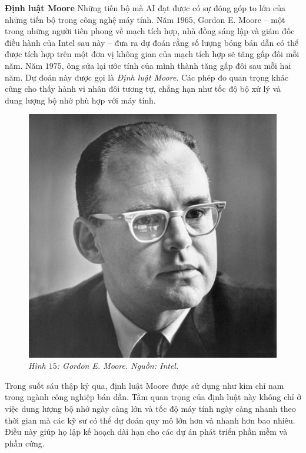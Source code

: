 \begin{multicols}{2}
	\vskip 0.1cm
	\textbf{\color{timhieukhoahoc}Định luật Moore}
	\vskip 0.1cm
	Những tiến bộ mà AI đạt được có sự đóng góp to lớn của những tiến bộ trong công nghệ máy tính. 
	\vskip 0.1cm
	Năm $1965$, Gordon E. Moore -- một trong những người tiên phong về mạch tích hợp, nhà đồng sáng lập và giám đốc điều hành của Intel sau này -- đưa ra dự đoán rằng số lượng bóng bán dẫn có thể được tích hợp trên một đơn vị không gian của mạch tích hợp sẽ tăng gấp đôi mỗi năm. Năm $1975$, ông sửa lại ước tính của mình thành tăng gấp đôi sau mỗi hai năm. Dự đoán này được gọi là \textit{Định luật Moore}. Các phép đo quan trọng khác cũng cho thấy hành vi nhân đôi tương tự, chẳng hạn như tốc độ bộ xử lý và dung lượng bộ nhớ phù hợp với máy tính. 
	\begin{figure}[H]
		\vspace*{-5pt}
		\centering
		\captionsetup{labelformat= empty, justification=centering}
		\includegraphics[width= 1\linewidth]{Gordon_E._Moore.jpg}
		\caption{\small\textit{\color{timhieukhoahoc}Hình $15$: Gordon E. Moore. Nguồn: Intel.}}
		\vspace*{-10pt}
	\end{figure}
	Trong suốt sáu thập kỷ qua, định luật Moore được sử dụng như kim chỉ nam trong ngành công nghiệp bán dẫn. Tầm quan trọng của định luật này không chỉ ở việc dung lượng bộ nhớ ngày càng lớn và tốc độ máy tính ngày càng nhanh theo thời gian mà các kỹ sư có thể dự đoán quy mô lớn hơn và nhanh hơn bao nhiêu. Điều này giúp họ lập kế hoạch dài hạn cho các dự án phát triển phần mềm và phần cứng. 

\end{multicols}

